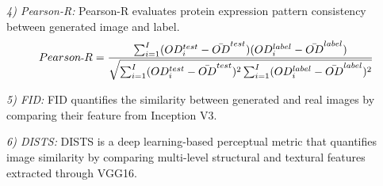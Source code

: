\documentclass[journal,twoside,web]{ieeecolor}
\begin{document}
\textit{4) Pearson-R:}
Pearson-R evaluates protein expression pattern consistency between generated image and label.
\begin{equation}
\footnotesize
Pearson\text{-}R = \frac{\sum_{i=1}^I (OD_i^{test} - \bar{OD}^{test})(OD_i^{label} - \bar{OD}^{label})}{\sqrt{\sum_{i=1}^I (OD_i^{test} - \bar{OD}^{test})^2 \sum_{i=1}^I (OD_i^{label} - \bar{OD}^{label})^2}}
\end{equation}

\textit{5) FID:} FID quantifies the similarity between generated and real images by comparing their feature from Inception V3. 


\textit{6) DISTS: }
DISTS is a deep learning-based perceptual metric that quantifies image similarity by comparing multi-level structural and textural features extracted through VGG16.

\end{document}
